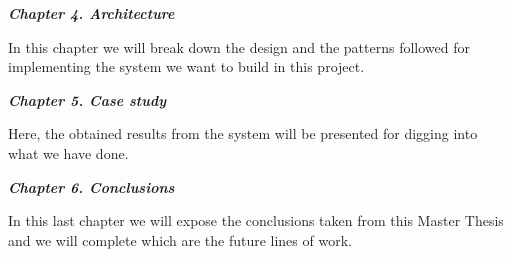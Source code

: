 \textbf{\textit{Chapter 4. Architecture}} 

In this chapter we will break down the design and the patterns followed for implementing the system we want to build in this project.

\textbf{\textit{Chapter 5. Case study}}

Here, the obtained results from the system will be presented for digging into what we have done.

\textbf{\textit{Chapter 6. Conclusions}} 

In this last chapter we will expose the conclusions taken from this Master Thesis and we will complete which are the future lines of work.
